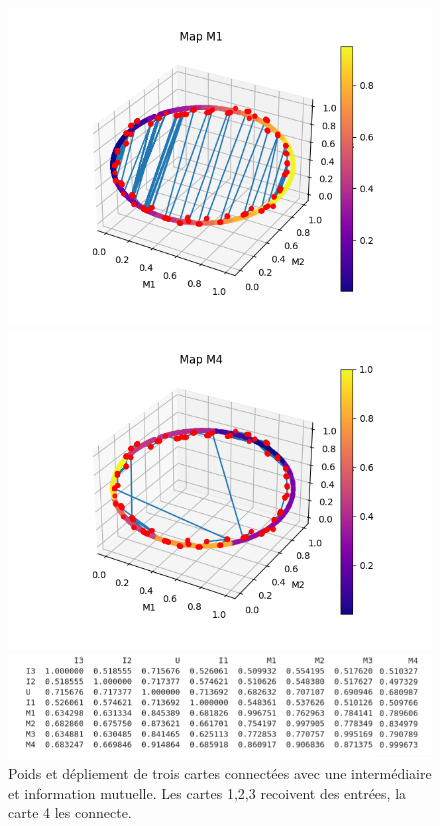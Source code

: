\begin{figure}[h!]
\begin{minipage}{0.33\textwidth}
\includegraphics[width=\textwidth]{3som_star_dw1.png}
\end{minipage}
\begin{minipage}{0.33\textwidth}
\includegraphics[width=\textwidth]{3som_star_dw4.png}
\end{minipage}
\begin{minipage}{0.33\textwidth}
\includegraphics[width=\textwidth]{3som_star_im.png}
\end{minipage}
\label{fig:3som_star_dw}
\caption{Poids et dépliement de trois cartes connectées avec une intermédiaire et information mutuelle. Les cartes 1,2,3 recoivent des entrées, la carte 4 les connecte.}
\label{fig:3som_star}
\end{figure}
